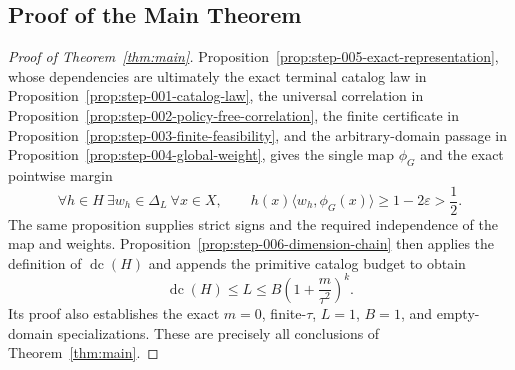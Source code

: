 \subsection{Proof of the Main Theorem}

\begin{proof}[Proof of Theorem~\ref{thm:main}]
Proposition~\ref{prop:step-005-exact-representation}, whose dependencies are
ultimately the exact terminal catalog law in
Proposition~\ref{prop:step-001-catalog-law}, the universal correlation in
Proposition~\ref{prop:step-002-policy-free-correlation}, the finite
certificate in Proposition~\ref{prop:step-003-finite-feasibility}, and the
arbitrary-domain passage in Proposition~\ref{prop:step-004-global-weight},
gives the single map $\phi_G$ and the exact pointwise margin
\[
\forall h\in H\ \exists w_h\in\Delta_L\ \forall x\in X,\qquad
h(x)\langle w_h,\phi_G(x)\rangle
\ge1-2\varepsilon>\frac12.
\]
The same proposition supplies strict signs and the required independence of
the map and weights.  Proposition~\ref{prop:step-006-dimension-chain} then
applies the definition of $\operatorname{dc}(H)$ and appends the primitive
catalog budget to obtain
\[
\operatorname{dc}(H)\le L
\le B\left(1+\frac{m}{\tau^2}\right)^k.
\]
Its proof also establishes the exact $m=0$, finite-$\tau$, $L=1$, $B=1$,
and empty-domain specializations.  These are precisely all conclusions of
Theorem~\ref{thm:main}.
\end{proof}
